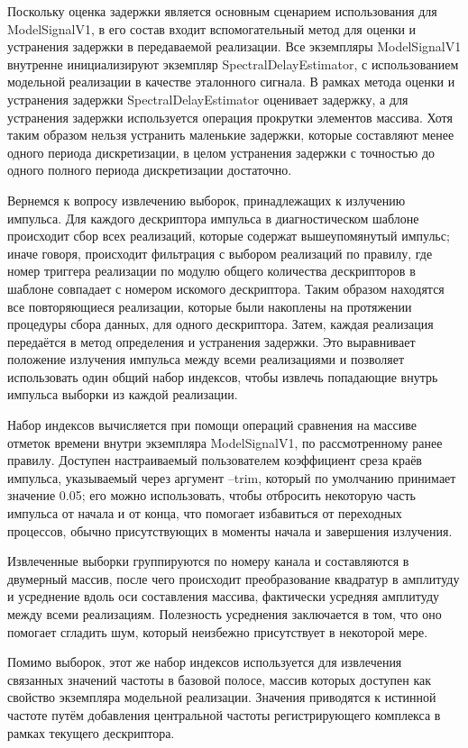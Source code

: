 \documentclass{report}
\begin{document}
Поскольку оценка задержки является основным сценарием использования для ModelSignalV1, в его состав входит вспомогательный метод для оценки и устранения задержки в передаваемой реализации. Все экземпляры ModelSignalV1 внутренне инициализируют экземпляр SpectralDelayEstimator, с использованием модельной реализации в качестве эталонного сигнала. В рамках метода оценки и устранения задержки SpectralDelayEstimator оценивает задержку, а для устранения задержки используется операция прокрутки элементов массива. Хотя таким образом нельзя устранить маленькие задержки, которые составляют менее одного периода дискретизации, в целом устранения задержки с точностью до одного полного периода дискретизации достаточно.

Вернемся к вопросу извлечению выборок, принадлежащих к излучению импульса. Для каждого дескриптора импульса в диагностическом шаблоне происходит сбор всех реализаций, которые содержат вышеупомянутый импульс; иначе говоря, происходит фильтрация с выбором реализаций по правилу, где номер триггера реализации по модулю общего количества дескрипторов в шаблоне совпадает с номером искомого дескриптора. Таким образом находятся все повторяющиеся реализации, которые были накоплены на протяжении процедуры сбора данных, для одного дескриптора. Затем, каждая реализация передаётся в метод определения и устранения задержки. Это выравнивает положение излучения импульса между всеми реализациями и позволяет использовать один общий набор индексов, чтобы извлечь попадающие внутрь импульса выборки из каждой реализации.

Набор индексов вычисляется при помощи операций сравнения на массиве отметок времени внутри экземпляра ModelSignalV1, по рассмотренному ранее правилу. Доступен настраиваемый пользователем коэффициент среза краёв импульса, указываемый через аргумент --trim, который по умолчанию принимает значение 0.05; его можно использовать, чтобы отбросить некоторую часть импульса от начала и от конца, что помогает избавиться от переходных процессов, обычно присутствующих в моменты начала и завершения излучения.

Извлеченные выборки группируются по номеру канала и составляются в двумерный массив, после чего происходит преобразование квадратур в амплитуду и усреднение вдоль оси составления массива, фактически усредняя амплитуду между всеми реализациям. Полезность усреднения заключается в том, что оно помогает сгладить шум, который неизбежно присутствует в некоторой мере.

Помимо выборок, этот же набор индексов используется для извлечения связанных значений частоты в базовой полосе, массив которых доступен как свойство экземпляра модельной реализации. Значения приводятся к истинной частоте путём добавления центральной частоты регистрирующего комплекса в рамках текущего дескриптора.
\end{document}
